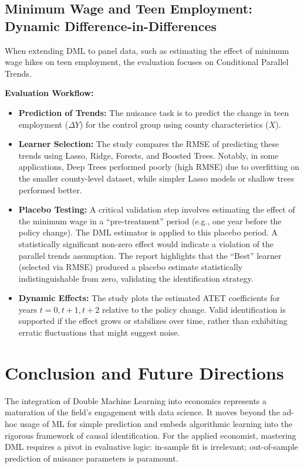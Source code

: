 \documentclass[12pt,a4paper]{article}
\begin{document}
\subsection{Minimum Wage and Teen Employment: Dynamic Difference-in-Differences}

When extending DML to panel data, such as estimating the effect of minimum wage hikes on teen employment, the evaluation focuses on Conditional Parallel Trends.

\textbf{Evaluation Workflow:}
\begin{itemize}
\item \textbf{Prediction of Trends:} The nuisance task is to predict the change in teen employment ($\Delta Y$) for the control group using county characteristics ($X$).
\item \textbf{Learner Selection:} The study compares the RMSE of predicting these trends using Lasso, Ridge, Forests, and Boosted Trees. Notably, in some applications, Deep Trees performed poorly (high RMSE) due to overfitting on the smaller county-level dataset, while simpler Lasso models or shallow trees performed better.
\item \textbf{Placebo Testing:} A critical validation step involves estimating the effect of the minimum wage in a ``pre-treatment'' period (e.g., one year before the policy change). The DML estimator is applied to this placebo period. A statistically significant non-zero effect would indicate a violation of the parallel trends assumption. The report highlights that the ``Best'' learner (selected via RMSE) produced a placebo estimate statistically indistinguishable from zero, validating the identification strategy.
\item \textbf{Dynamic Effects:} The study plots the estimated ATET coefficients for years $t=0, t+1, t+2$ relative to the policy change. Valid identification is supported if the effect grows or stabilizes over time, rather than exhibiting erratic fluctuations that might suggest noise.
\end{itemize}

\section{Conclusion and Future Directions}

The integration of Double Machine Learning into economics represents a maturation of the field's engagement with data science. It moves beyond the ad-hoc usage of ML for simple prediction and embeds algorithmic learning into the rigorous framework of causal identification. For the applied economist, mastering DML requires a pivot in evaluative logic: in-sample fit is irrelevant; out-of-sample prediction of nuisance parameters is paramount.
\end{document}
